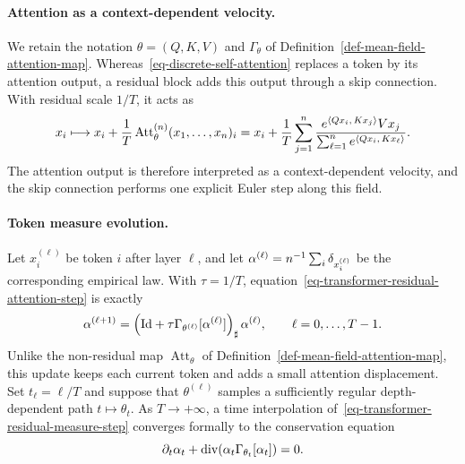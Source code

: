 \paragraph{Attention as a context-dependent velocity.}

We retain the notation \(\theta=(Q,K,V)\) and \(\Gamma_\theta\) of Definition~\ref{def-mean-field-attention-map}. Whereas~\eqref{eq-discrete-self-attention} replaces a token by its attention output, a residual block adds this output through a skip connection. With residual scale \(1/T\), it acts as
\begin{equation}\label{eq-transformer-residual-attention-step}
	x_i
	\longmapsto
	x_i+\frac1T\operatorname{Att}^{(n)}_\theta(x_1,\ldots,x_n)_i
	=
	x_i+\frac1T
	\sum_{j=1}^n
	\frac{e^{\langle Qx_i,\,Kx_j\rangle}Vx_j}
	{\sum_{\ell=1}^n e^{\langle Qx_i,\,Kx_\ell\rangle}}.
\end{equation}
The attention output is therefore interpreted as a context-dependent velocity, and the skip connection performs one explicit Euler step along this field.

\paragraph{Token measure evolution.}

Let \(x_i^{(\ell)}\) be token \(i\) after layer \(\ell\), and let \(\alpha^{(\ell)}=n^{-1}\sum_i\delta_{x_i^{(\ell)}}\) be the corresponding empirical law. With \(\tau=1/T\), equation~\eqref{eq-transformer-residual-attention-step} is exactly
\begin{equation}\label{eq-transformer-residual-measure-step}
	\alpha^{(\ell+1)}
	=
	\left(
		\mathrm{Id}+\tau\Gamma_{\theta^{(\ell)}}[\alpha^{(\ell)}]
	\right)_\sharp
	\alpha^{(\ell)},
	\qquad
	\ell=0,\ldots,T-1.
\end{equation}
Unlike the non-residual map \(\operatorname{Att}_\theta\) of Definition~\ref{def-mean-field-attention-map}, this update keeps each current token and adds a small attention displacement.
Set \(t_\ell=\ell/T\) and suppose that \(\theta^{(\ell)}\) samples a sufficiently regular depth-dependent path \(t\mapsto\theta_t\). As \(T\to+\infty\), a time interpolation of~\eqref{eq-transformer-residual-measure-step} converges formally to the conservation equation
\begin{equation}\label{eq-transformer-mean-field-pde}
	\partial_t\alpha_t
	+
	\operatorname{div}\!\left(\alpha_t\Gamma_{\theta_t}[\alpha_t]\right)
	=
	0.
\end{equation}



